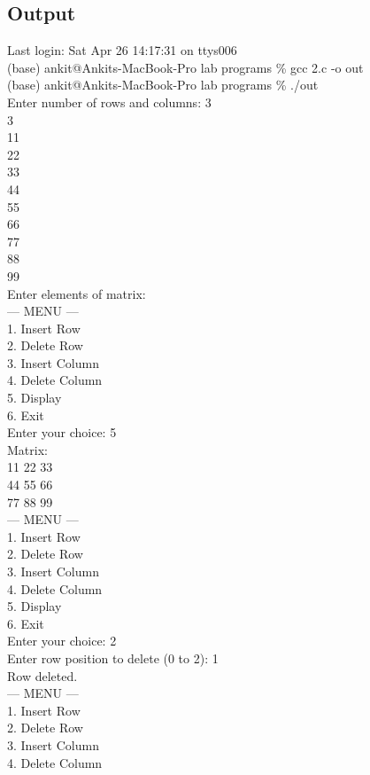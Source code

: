\documentclass[12pt,a4paper]{article}
\begin{document}
\subsection*{Output}
\begin{tcolorbox}[creambox]
Last login: Sat Apr 26 14:17:31 on ttys006\\
(base) ankit@Ankits-MacBook-Pro lab programs \% gcc 2.c -o out\\
(base) ankit@Ankits-MacBook-Pro lab programs \% ./out\\
Enter number of rows and columns: 3\\
3\\
11\\
22\\
33\\
44\\
55\\
66\\
77\\
88\\
99\\
Enter elements of matrix:\\
--- MENU ---\\
1. Insert Row\\
2. Delete Row\\
3. Insert Column\\
4. Delete Column\\
5. Display\\
6. Exit\\
Enter your choice: 5\\
Matrix:\\
11 22 33\\
44 55 66\\
77 88 99\\
--- MENU ---\\
1. Insert Row\\
2. Delete Row\\
3. Insert Column\\
4. Delete Column\\
5. Display\\
6. Exit\\
Enter your choice: 2\\
Enter row position to delete (0 to 2): 1\\
Row deleted.\\
--- MENU ---\\
1. Insert Row\\
2. Delete Row\\
3. Insert Column\\
4. Delete Column\\

\end{tcolorbox}
\end{document}
